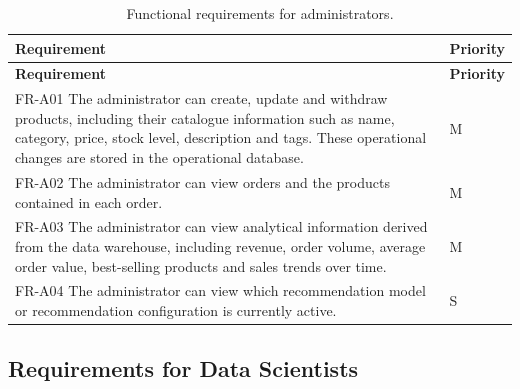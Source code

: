 \documentclass[a4paper,12pt]{article}
\newcommand{\tablestyle}{%
  \small\setstretch{1.05}%
  \renewcommand{\arraystretch}{1.25}%
  \setlength{\extrarowheight}{3pt}%
  \arrayrulecolor{tableborder}%
}
\newcommand{\req}[1]{\textsf{\small #1}}
\begin{document}
{\tablestyle
\begin{longtable}{|L{\dimexpr\textwidth-2cm-4\arrayrulewidth\relax}|C{2cm}|}
  \caption{Functional requirements for administrators.}
  \label{tab:fr-admin}\\
  \hline
  \textbf{Requirement} & \textbf{Priority} \\
  \hline
  \endfirsthead
  \hline
  \textbf{Requirement} & \textbf{Priority} \\
  \hline
  \endhead
  \endfoot
  \endlastfoot

  \req{FR-A01} The administrator can create, update and withdraw products, including their catalogue
  information such as name, category, price, stock level, description and tags. These operational
  changes are stored in the operational database. & M \\[3pt]\hline
  \req{FR-A02} The administrator can view orders and the products contained in each order. & M \\[3pt]\hline
  \req{FR-A03} The administrator can view analytical information derived from the data warehouse, including
  revenue, order volume, average order value, best-selling products and sales trends over time. & M \\[3pt]\hline
  \req{FR-A04} The administrator can view which recommendation model or recommendation configuration is
  currently active. & S \\[3pt]\hline
\end{longtable}
}


\subsection{Requirements for Data Scientists}
\end{document}
